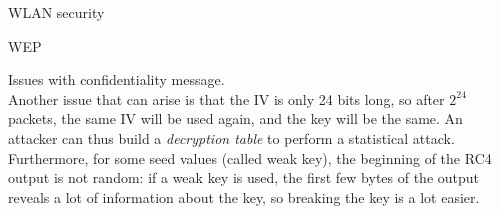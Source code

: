 \begin{section}{WLAN security}
\begin{subsection}{WEP}
\begin{subsubsection}{Issues with confidentiality}
      message.\\
      Another issue that can arise is that the IV is only 24 bits long, so after $2^{24}$ packets,
      the same IV will be used again, and the key will be the same. An attacker can thus build a 
      \textit{decryption table} to perform a statistical attack.\\
      Furthermore, for some seed values (called weak key), the beginning of the RC4 output is
      not random: if a weak key is used, the first few bytes of the output reveals a lot of 
      information about the key, so breaking the key is a lot easier.
    \end{subsubsection}
  \end{subsection}

\end{section}


